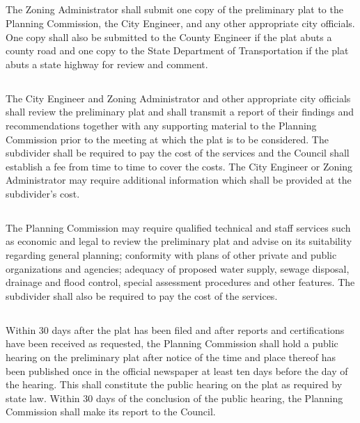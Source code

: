 \subsection{}
The Zoning Administrator shall submit one copy of the preliminary plat to the Planning Commission, the City Engineer, and any other appropriate city officials. One copy shall also be submitted to the County Engineer if the plat abuts a county road and one copy to the State Department of Transportation if the plat abuts a state highway for review and comment.
\subsection{}
The City Engineer and Zoning Administrator and other appropriate city officials shall review the preliminary plat and shall transmit a report of their findings and recommendations together with any supporting material to the Planning Commission prior to the meeting at which the plat is to be considered. The subdivider shall be required to pay the cost of the services and the Council shall establish a fee from time to time to cover the costs. The City Engineer or Zoning Administrator may require additional information which shall be provided at the subdivider’s cost.
\subsection{}
The Planning Commission may require qualified technical and staff services such as economic and legal to review the preliminary plat and advise on its suitability regarding general planning; conformity with plans of other private and public organizations and agencies; adequacy of proposed water supply, sewage disposal, drainage and flood control, special assessment procedures and other features. The subdivider shall also be required to pay the cost of the services.
\subsection{}
Within 30 days after the plat has been filed and after reports and certifications have been received as requested, the Planning Commission shall hold a public hearing on the preliminary plat after notice of the time and place thereof has been published once in the official newspaper at least ten days before the day of the hearing. This shall constitute the public hearing on the plat as required by state law. Within 30 days of the conclusion of the public hearing, the Planning Commission shall make its report to the Council.
